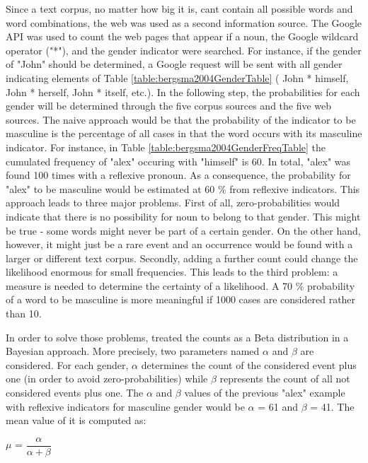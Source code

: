 Since a text corpus, no matter how big it is, cant contain all possible words and word combinations, the web was used as a second information source. The Google API was used to count the web pages that appear if a noun, the Google wildcard operator ("*"), and the gender indicator were searched. For instance, if the gender of "John" should be determined, a Google request will be sent with all gender indicating elements of Table \ref{table:bergsma2004GenderTable} ( John * himself, John * herself, John * itself, etc.).
In the following step, the probabilities for each gender will be determined through the five corpus sources and the five web sources. The naive approach would be that the probability of the indicator to be masculine is the percentage of all cases in that the word occurs with its masculine indicator. For instance, in Table \ref{table:bergsma2004GenderFreqTable} the cumulated frequency of "alex" occuring with "himself" is 60. In total, "alex" was found 100 times with a reflexive pronoun. As a consequence, the probability for "alex" to be masculine would be estimated at 60 \% from reflexive indicators.
This approach leads to three major problems. First of all, zero-probabilities would indicate that there is no possibility for noun to belong to that gender. This might be true - some words might never be part of a certain gender. On the other hand, however, it might just be a rare event and an occurrence would be found with a larger or different text corpus. Secondly, adding a further count could change the likelihood enormous for small frequencies. This leads to the third problem: a measure is needed to determine the certainty of a likelihood. A 70 \% probability of a word to be masculine is more meaningful if 1000 cases are considered rather than 10. 
 
In order to solve those problems, \cite{bergsma2005automatic} treated the counts as a Beta distribution in a Bayesian approach. More precisely, two parameters named $\alpha$ and $\beta$ are considered. For each gender, $\alpha$ determines the count of the considered event plus one (in order to avoid zero-probabilities) while $\beta$ represents the count of all not considered events plus one. The $\alpha$ and $\beta$ values of the previous "alex" example with reflexive indicators for masculine gender would be $\alpha$ = 61 and $\beta$ = 41. The mean value of it is computed as:
\begin{center}
	 $\mu$ =  $\dfrac{\alpha }{\alpha + \beta}$  
\end{center}

